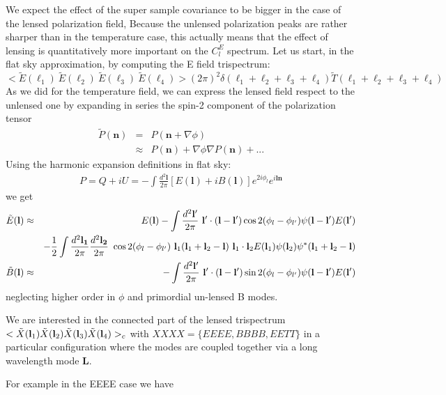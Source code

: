 \documentclass[prd,onecolumn,amsmath,amssymb,floatfix,superscriptaddress,notitlepage]{revtex4-1}
\def\be{\begin{equation}}
\def\ee{\end{equation}}
\def\ba{\begin{eqnarray}}
\def\ea{\end{eqnarray}}
\newcommand{\bl}{{\bf l}}
\newcommand{\bL}{{\bf L}}
\begin{document}
We expect the effect of the super sample covariance to be bigger in the case of the lensed polarization field, Because the unlensed polarization peaks are rather sharper than in the temperature case, this actually means that the effect of lensing is quantitatively more important on the $C_{l}^{E}$ spectrum. Let us start, in the flat sky approximation, by computing the E field trispectrum:
\be
<\tilde E(\ell_{1})~\tilde E(\ell_{2})~\tilde E(\ell_{3})~\tilde E(\ell_{4})> (2\pi)^{2} \delta(\ell_{1}+\ell_{2}+\ell_{3}+\ell_{4})\tilde T(\ell_{1}+\ell_{2}+\ell_{3}+\ell_{4})
\ee
As we did for the temperature field, we can express the lensed field respect to the unlensed one by expanding in series the spin-2 component of the polarization tensor 
\ba
\tilde P(\mathbf{n})&=&P(\mathbf{n}+\nabla \phi)\nonumber\\
&\approx& P(\mathbf{n})+\nabla \phi \nabla P(\mathbf{n})+ ...\nonumber
\ea
Using the harmonic expansion definitions in flat sky:
\ba
P=Q+iU=-\int\frac{d^{2}\mathbf{l}}{2\pi}[E(\mathbf{l})+iB(\mathbf{l})]e^{2i\phi_{l}}e^{i\mathbf{l}\mathbf{n}}
\ea
we get
\ba
\tilde E(\mathbf{l})&\approx& E(\mathbf{l})-\int\frac{d^{2}\mathbf{l'}}{2\pi}~\mathbf{l'}\cdot(\mathbf{l}-\mathbf{l'})\cos2(\phi_{l}-\phi_{l'})\psi(\mathbf{l}-\mathbf{l'})E(\mathbf{l'})\nonumber\\
&&-\frac12 \int\frac{d^{2}\mathbf{l_{1}}}{2\pi}\frac{d^{2}\mathbf{l_{2}}}{2\pi}~ \cos2(\phi_{l}-\phi_{l'}) ~\bl_{1}(\bl_{1}+\bl_{2}-\bl)~\bl_{1}\cdot\bl_{2}E(\bl_{1})\psi(\bl_{2})\psi^{*}(\bl_{1}+\bl_{2}-\bl)\\
\tilde B(\mathbf{l})&\approx&-\int\frac{d^{2}\mathbf{l'}}{2\pi}~\mathbf{l'}\cdot(\mathbf{l}-\mathbf{l'})\sin2(\phi_{l}-\phi_{l'})\psi(\mathbf{l}-\mathbf{l'})E(\mathbf{l'})
\ea
neglecting higher order in $\phi$ and primordial un-lensed B modes.

We are interested in the connected part of the lensed trispectrum $<\tilde X(\bl_{1})\tilde X(\bl_{2})\tilde X(\bl_{3})\tilde X(\bl_{4})>_{c}$ with $XXXX=\{EEEE,BBBB,EETT\}$ in a particular configuration where the modes are coupled together via a long wavelength mode \bL.

For example in the EEEE case we have
\end{document}
